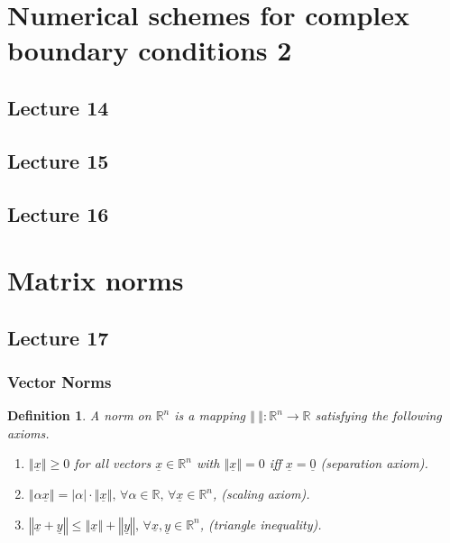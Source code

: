 \documentclass{article}
\newtheorem{definition}{Definition}
\begin{document}
\section{Numerical schemes for complex boundary conditions 2}
\subsection{Lecture 14}
\subsection{Lecture 15}
\subsection{Lecture 16}


\section{Matrix norms}
\subsection{Lecture 17}
\subsubsection{Vector Norms}
\begin{definition}
    A norm on $\mathbb{R}^n$ is a mapping $\left\Vert \ \right\Vert:\mathbb{R}^n\to\mathbb{R}$ satisfying the following axioms.
    \begin{enumerate}
        \item $\left\Vert \underline{x} \right\Vert\geq0$ for all vectors $\underline{x}\in \mathbb{R}^n$ with $\left\Vert \underline{x} \right\Vert=0$ iff $\underline{x}=\underline{0}$ (separation axiom).
        \item $\left\Vert \alpha\underline{x} \right\Vert=\vert\alpha\vert\cdot\left\Vert \underline{x} \right\Vert,\, \forall\alpha\in\mathbb{R},\,\forall\underline{x}\in\mathbb{R}^n$, (scaling axiom).
        \item $\left\Vert \underline{x}+\underline{y} \right\Vert\leq\left\Vert \underline{x} \right\Vert+\left\Vert \underline{y} \right\Vert,\,\forall\underline{x},\underline{y}\in\mathbb{R}^n$, (triangle inequality).
    \end{enumerate}
\end{definition}
\end{document}
